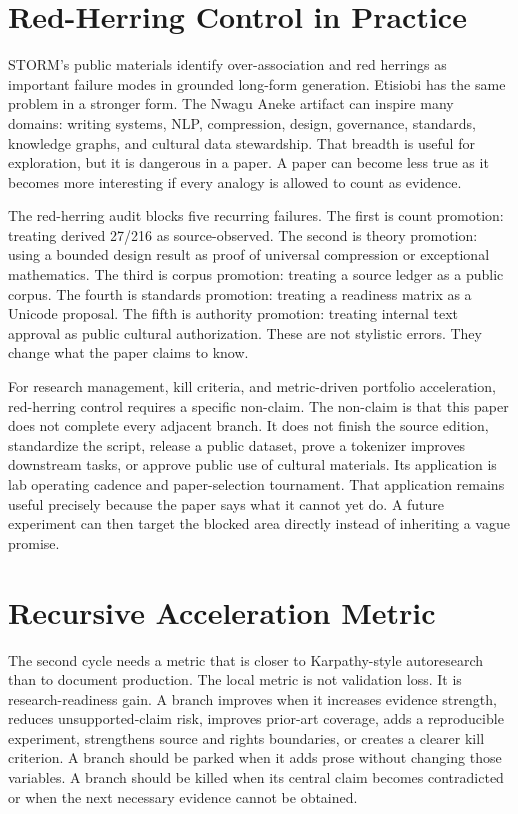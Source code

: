 \documentclass[sigconf,nonacm]{acmart}
\begin{document}
\section{Red-Herring Control in Practice}
STORM's public materials identify over-association and red herrings as important
failure modes in grounded long-form generation. Etisiobi has the same problem in
a stronger form. The Nwagu Aneke artifact can inspire many domains: writing
systems, NLP, compression, design, governance, standards, knowledge graphs, and
cultural data stewardship. That breadth is useful for exploration, but it is
dangerous in a paper. A paper can become less true as it becomes more
interesting if every analogy is allowed to count as evidence.

The red-herring audit blocks five recurring failures. The first is count
promotion: treating derived 27/216 as source-observed. The second is theory
promotion: using a bounded design result as proof of universal compression or
exceptional mathematics. The third is corpus promotion: treating a source
ledger as a public corpus. The fourth is standards promotion: treating a
readiness matrix as a Unicode proposal. The fifth is authority promotion:
treating internal text approval as public cultural authorization. These are not
stylistic errors. They change what the paper claims to know.

For research management, kill criteria, and metric-driven portfolio acceleration, red-herring control requires a specific non-claim. The non-claim is
that this paper does not complete every adjacent branch. It does not finish the
source edition, standardize the script, release a public dataset, prove a
tokenizer improves downstream tasks, or approve public use of cultural
materials. Its application is lab operating cadence and paper-selection tournament. That application remains useful
precisely because the paper says what it cannot yet do. A future experiment can
then target the blocked area directly instead of inheriting a vague promise.

\section{Recursive Acceleration Metric}
The second cycle needs a metric that is closer to Karpathy-style autoresearch
than to document production. The local metric is not validation loss. It is
research-readiness gain. A branch improves when it increases evidence strength,
reduces unsupported-claim risk, improves prior-art coverage, adds a reproducible
experiment, strengthens source and rights boundaries, or creates a clearer kill
criterion. A branch should be parked when it adds prose without changing those
variables. A branch should be killed when its central claim becomes contradicted
or when the next necessary evidence cannot be obtained.
\end{document}
